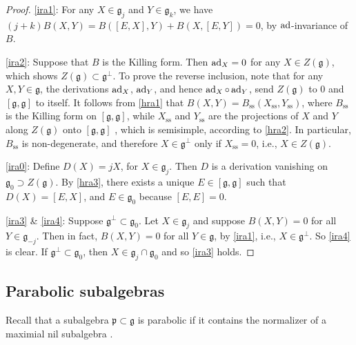 \documentclass[leqno,12pt]{amsart} %
\begin{document}
\begin{proof}
    \eqref{ira1}: For any $X \in {\mathfrak g}_j$ and $Y \in {\mathfrak g}_k$, we have
  $(j + k) B(X, Y) = B([E, X], Y) + B(X, [E, Y]) = 0$, by $\operatorname{ad}$-invariance of $B$.

  \eqref{ira2}: Suppose that $B$ is the Killing form. Then $\operatorname{ad}_X = 0$ for any
  $X \in Z({\mathfrak g})$, which shows $Z({\mathfrak g}) \subset {\mathfrak g}^\perp$. To
  prove the reverse inclusion, note that for any $X, Y \in {\mathfrak g}$, the derivations
  $\operatorname{ad}_X$, $\operatorname{ad}_Y$, and hence $\operatorname{ad}_X \circ \operatorname{ad}_Y$, send
  $Z({\mathfrak g})$ to $0$ and $[{\mathfrak g} , {\mathfrak g}]$ to itself. It follows
  from \eqref{hra1} that $B(X, Y) = B_\mathrm{ss}(X_{\mathrm{ss}}, Y_{\mathrm{ss}})$,
  where $B_\mathrm{ss}$ is the Killing form on $[{\mathfrak g}, {\mathfrak g}] $, while
  $X_{\mathrm{ss}}$ and $Y_{\mathrm{ss}}$ are the projections of $X$ and $Y$ along
  $Z({\mathfrak g})$ onto $[{\mathfrak g}, {\mathfrak g}]$ , which is semisimple,
  according to \eqref{hra2}. In particular, $B_{\mathrm{ss}}$ is non-degenerate, and
  therefore $X \in {\mathfrak g}^\perp$ only if $X_\mathrm{ss}=0$, i.e.,
  $X \in Z({\mathfrak g})$.

  \eqref{ira0}: Define $D(X) = jX$, for $X \in {\mathfrak g}_j$. Then $D$ is a
  derivation vanishing on ${\mathfrak g}_0\supset Z({\mathfrak g})$. By \eqref{hra3},
  there exists a unique $E \in [{\mathfrak g}, {\mathfrak g}]$ such that $D(X) = [E, X]$,
  and $E \in {\mathfrak g}_0$ because $[E, E]=0$.

  \eqref{ira3} \& \eqref{ira4}: Suppose
  ${\mathfrak g}^\perp \subset {\mathfrak g}_0$.  Let $X \in {\mathfrak g}_j$ and suppose
  $B(X, Y) = 0$ for all $Y \in {\mathfrak g}_{-j}$. Then in fact, $B(X, Y)=0$ for all
  $Y \in {\mathfrak g}$, by \eqref{ira1}, i.e., $X \in {\mathfrak g}^\perp$. So
  \eqref{ira4} is clear. If ${\mathfrak g}^\perp \subset {\mathfrak g}_0$,
  then $X \in {\mathfrak g}_j\cap {\mathfrak g}_0$ and so \eqref{ira3} holds.
\end{proof}

\subsection{Parabolic subalgebras}
\label{parabolic_characterizations}
Recall that a subalgebra ${\mathfrak p} \subset {\mathfrak g} $ is {\df parabolic} if it
contains the normalizer of a maximial nil subalgebra \cite{Calderbank_Noppakaew_16}.
\end{document}
